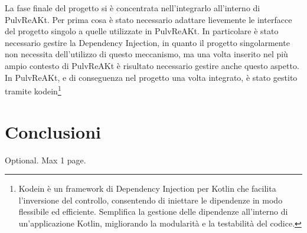 \documentclass[12pt,a4paper,openright,twoside]{book}
\begin{document}
La fase finale del progetto si è concentrata nell'integrarlo all'interno di PulvReAKt.
Per prima cosa è stato necessario adattare lievemente le interfacce del progetto singolo a quelle utilizzate in PulvReAKt.
In particolare è stato necessario gestire la Dependency Injection, in quanto il progetto singolarmente non necessita dell'utilizzo di questo meccanismo, 
ma una volta inserito nel più ampio contesto di PulvReAKt è risultato necessario gestire anche questo aspetto. 
In PulvReAKt, e di conseguenza nel progetto una volta integrato, è stato gestito tramite kodein\footnote{
    Kodein è un framework di Dependency Injection per Kotlin che facilita l'inversione del controllo, consentendo di iniettare le 
    dipendenze in modo flessibile ed efficiente. Semplifica la gestione delle dipendenze all'interno di un'applicazione Kotlin, 
    migliorando la modularità e la testabilità del codice.
} 

\chapter{Conclusioni}\label{chap:Conclusioni}


\backmatter

\nocite{*}




\begin{acknowledgements}
Optional. Max 1 page.
\end{acknowledgements}
\end{document}

